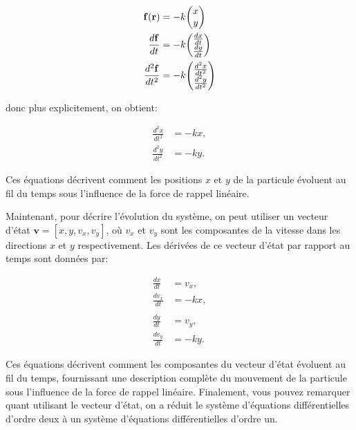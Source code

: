 \documentclass[11pt]{article}
\begin{document}
\begin{align*}
    \mathbf{f}(\mathbf{r}) &= -k \mqty(x \\ y) \\
    \frac{d\mathbf{f}}{dt} &= -k\mqty(\frac{dx}{dt} \\ \frac{dy}{dt}) \\
    \frac{d^2\mathbf{f}}{dt^2} &= -k\mqty(\frac{d^2x}{dt^2} \\ \frac{d^2y}{dt^2})
\end{align*}

\noindent donc plus explicitement, on obtient:

\[
\begin{align*}
\frac{d^2x}{dt^2} &= -k x, \\
\frac{d^2y}{dt^2} &= -k y.
\end{align*}
\]

\noindent Ces équations décrivent comment les positions \(x\) et \(y\) de la particule évoluent au fil du temps sous
l'influence de la force de rappel linéaire.

\bigskip

\noindent Maintenant, pour décrire l'évolution du système, on peut utiliser un vecteur
d'état \(\mathbf{v} = [x, y, v_x, v_y]\), où \(v_x\) et \(v_y\) sont les composantes de la vitesse dans les
directions \(x\) et \(y\) respectivement.
Les dérivées de ce vecteur d'état par rapport au temps sont données par:

\[
\begin{align*}
\frac{dx}{dt} &= v_x, \\
\frac{dv_x}{dt} &= -k x, \\
\\
\frac{dy}{dt} &= v_y, \\
\frac{dv_y}{dt} &= -k y.
\end{align*}
\]

\noindent Ces équations décrivent comment les composantes du vecteur d'état évoluent au fil du temps, fournissant une
description complète du mouvement de la particule sous l'influence de la force de rappel linéaire.
Finalement, vous pouvez remarquer quant utilisant le vecteur d'état, on a réduit le système d'équations différentielles
d'ordre deux à un système d'équations différentielles d'ordre un.
\end{document}
